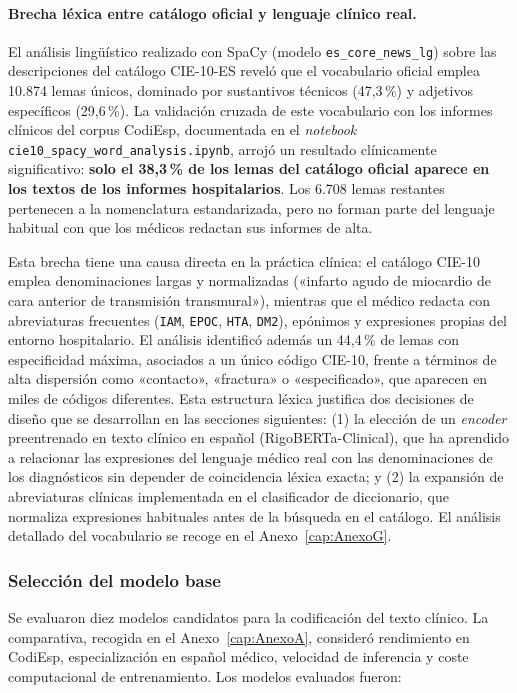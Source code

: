 \paragraph{Brecha léxica entre catálogo oficial y lenguaje clínico real.}
El análisis lingüístico realizado con SpaCy (modelo \texttt{es\_core\_news\_lg}) sobre las descripciones del catálogo CIE-10-ES reveló que el vocabulario oficial emplea 10.874 lemas únicos, dominado por sustantivos técnicos (47,3\,\%) y adjetivos específicos (29,6\,\%). La validación cruzada de este vocabulario con los informes clínicos del corpus CodiEsp, documentada en el \emph{notebook} \texttt{cie10\_spacy\_word\_analysis.ipynb}, arrojó un resultado clínicamente significativo: \textbf{solo el 38,3\,\% de los lemas del catálogo oficial aparece en los textos de los informes hospitalarios}. Los 6.708 lemas restantes pertenecen a la nomenclatura estandarizada, pero no forman parte del lenguaje habitual con que los médicos redactan sus informes de alta.

Esta brecha tiene una causa directa en la práctica clínica: el catálogo CIE-10 emplea denominaciones largas y normalizadas («infarto agudo de miocardio de cara anterior de transmisión transmural»), mientras que el médico redacta con abreviaturas frecuentes (\texttt{IAM}, \texttt{EPOC}, \texttt{HTA}, \texttt{DM2}), epónimos y expresiones propias del entorno hospitalario. El análisis identificó además un 44,4\,\% de lemas con especificidad máxima, asociados a un único código CIE-10, frente a términos de alta dispersión como «contacto», «fractura» o «especificado», que aparecen en miles de códigos diferentes. Esta estructura léxica justifica dos decisiones de diseño que se desarrollan en las secciones siguientes: (1) la elección de un \emph{encoder} preentrenado en texto clínico en español (RigoBERTa-Clinical), que ha aprendido a relacionar las expresiones del lenguaje médico real con las denominaciones de los diagnósticos sin depender de coincidencia léxica exacta; y (2) la expansión de abreviaturas clínicas implementada en el clasificador de diccionario, que normaliza expresiones habituales antes de la búsqueda en el catálogo. El análisis detallado del vocabulario se recoge en el Anexo~\ref{cap:AnexoG}.

\subsubsection{Selección del modelo base}

Se evaluaron diez modelos candidatos para la codificación del texto clínico. La comparativa, recogida en el Anexo~\ref{cap:AnexoA}, consideró rendimiento en CodiEsp, especialización en español médico, velocidad de inferencia y coste computacional de entrenamiento. Los modelos evaluados fueron:

